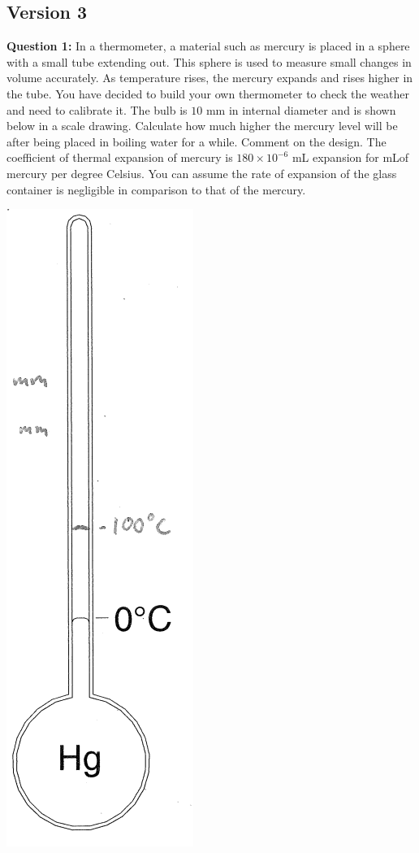 \documentclass{article}
\begin{document}
\subsection*{Version 3}
\textbf{Question 1:} In a thermometer, a material such as mercury is placed in a sphere with a small tube extending out. This sphere is used to measure small changes in volume accurately. As temperature rises, the mercury expands and rises higher in the tube. You have decided to build your own thermometer to check the weather and need to calibrate it. The bulb is $10 \text{ mm}$ in internal diameter and is shown below in a scale drawing. Calculate how much higher the mercury level will be after being placed in boiling water for a while. Comment on the design. The coefficient of thermal expansion of mercury is $180\times 10^{-6}$ mL expansion for mLof mercury per degree Celsius. You can assume the rate of expansion of the glass container is negligible in comparison to that of the mercury.
\begin{center}
    \includegraphics[width=0.3\linewidth]{2011-3-1.png}
\end{center}
\end{document}
